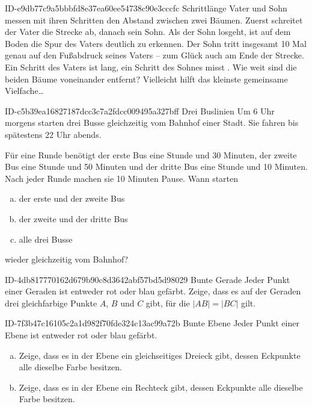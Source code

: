 \begin{exercise}
      {ID-e9db77c9a5bbbfd8e37ea60ee54738c90e3cccfc}
      {Schrittlänge}
  \ifproblem\problem
    Vater und Sohn messen mit ihren Schritten den Abstand zwischen zwei Bäumen.
    Zuerst schreitet der Vater die Strecke ab, danach sein Sohn. Als der Sohn
    losgeht, ist auf dem Boden die Spur des Vaters deutlich zu erkennen.
    Der Sohn tritt insgesamt 10 Mal genau auf den Fußabdruck seines Vaters --
    zum Glück auch am Ende der Strecke. Ein Schritt des Vaters ist 
    lang, ein Schritt des Sohnes misst . Wie weit sind die beiden
    Bäume voneinander entfernt?
  \fi
  \ifoutline\outline
    Vielleicht hilft das kleinste gemeinsame Vielfache\ldots
  \fi
\end{exercise}

\begin{exercise}
      {ID-c5b39ea16827187dcc3c7a2fdcc009495a327bff}
      {Drei Buslinien}
  \ifproblem\problem
    Um 6 Uhr morgens starten drei Busse gleichzeitig vom Bahnhof einer Stadt.
    Sie fahren bis spätestens 22 Uhr abends.\par
    Für eine Runde benötigt
    der erste Bus eine Stunde und 30 Minuten,
    der zweite Bus eine Stunde und 50 Minuten und
    der dritte Bus eine Stunde und 10 Minuten.
    Nach jeder Runde machen sie 10 Minuten Pause.
    Wann starten
    \begin{enumerate}[a)]
      \item der erste und der zweite Bus
      \item der zweite und der dritte Bus
      \item alle drei Busse
    \end{enumerate}
    wieder gleichzeitig vom Bahnhof?
  \fi
\end{exercise}

\begin{exercise}
      {ID-4db817770162d679b90c8d3642abf57bd5d98029}
      {Bunte Gerade}
  \ifproblem\problem
    Jeder Punkt einer Geraden ist entweder rot oder blau gefärbt.
    Zeige, dass es auf der Geraden drei gleichfarbige Punkte $A$,
    $B$ und $C$ gibt, für die $|AB|=|BC|$ gilt.
  \fi
\end{exercise}

\begin{exercise}
      {ID-7f3b47c16105c2a1d982f70fde324c13ac99a72b}
      {Bunte Ebene}
  \ifproblem\problem
    Jeder Punkt einer Ebene ist entweder rot oder blau gefärbt.
    \begin{enumerate}[a)]
      \item Zeige, dass es in der Ebene ein gleichseitiges Dreieck gibt,
            dessen Eckpunkte alle dieselbe Farbe besitzen.
      \item Zeige, dass es in der Ebene ein Rechteck gibt,
            dessen Eckpunkte alle dieselbe Farbe besitzen.
    \end{enumerate}
  \fi
\end{exercise}

